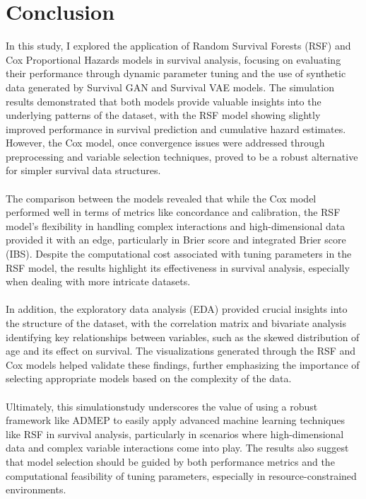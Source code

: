 \chapter{Conclusion}
\label{Chapter4}


\noindent In this study, I explored the application of Random Survival Forests (RSF) and Cox Proportional Hazards models in survival analysis, focusing on evaluating their performance through dynamic parameter tuning and the use of synthetic data generated by Survival GAN and Survival VAE models. The simulation results demonstrated that both models provide valuable insights into the underlying patterns of the dataset, with the RSF model showing slightly improved performance in survival prediction and cumulative hazard estimates. However, the Cox model, once convergence issues were addressed through preprocessing and variable selection techniques, proved to be a robust alternative for simpler survival data structures.
\\\\
\noindent The comparison between the models revealed that while the Cox model performed well in terms of metrics like concordance and calibration, the RSF model's flexibility in handling complex interactions and high-dimensional data provided it with an edge, particularly in Brier score and integrated Brier score (IBS). Despite the computational cost associated with tuning parameters in the RSF model, the results highlight its effectiveness in survival analysis, especially when dealing with more intricate datasets.
\\\\
\noindent In addition, the exploratory data analysis (EDA) provided crucial insights into the structure of the dataset, with the correlation matrix and bivariate analysis identifying key relationships between variables, such as the skewed distribution of age and its effect on survival. The visualizations generated through the RSF and Cox models helped validate these findings, further emphasizing the importance of selecting appropriate models based on the complexity of the data.
\\\\
\noindent Ultimately, this simulationstudy underscores the value of using a robust framework like ADMEP \parencite{morris_using_2019} to easily apply advanced machine learning techniques like RSF in survival analysis, particularly in scenarios where high-dimensional data and complex variable interactions come into play. The results also suggest that model selection should be guided by both performance metrics and the computational feasibility of tuning parameters, especially in resource-constrained environments.
